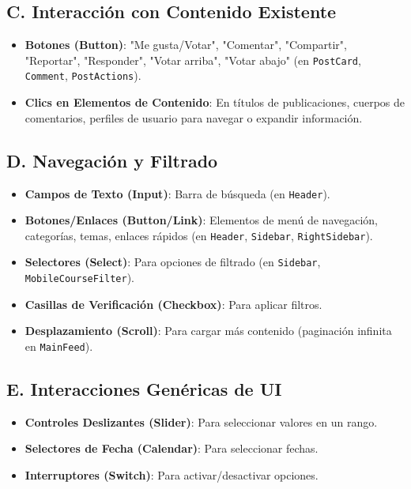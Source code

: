 \documentclass{article}
\begin{document}
\subsection*{C. Interacción con Contenido Existente}
\begin{itemize}
    \item \textbf{Botones (Button)}: "Me gusta/Votar", "Comentar", "Compartir", "Reportar", "Responder", "Votar arriba", "Votar abajo" (en \texttt{PostCard}, \texttt{Comment}, \texttt{PostActions}).
    \item \textbf{Clics en Elementos de Contenido}: En títulos de publicaciones, cuerpos de comentarios, perfiles de usuario para navegar o expandir información.
\end{itemize}

\subsection*{D. Navegación y Filtrado}
\begin{itemize}
    \item \textbf{Campos de Texto (Input)}: Barra de búsqueda (en \texttt{Header}).
    \item \textbf{Botones/Enlaces (Button/Link)}: Elementos de menú de navegación, categorías, temas, enlaces rápidos (en \texttt{Header}, \texttt{Sidebar}, \texttt{RightSidebar}).
    \item \textbf{Selectores (Select)}: Para opciones de filtrado (en \texttt{Sidebar}, \texttt{MobileCourseFilter}).
    \item \textbf{Casillas de Verificación (Checkbox)}: Para aplicar filtros.
    \item \textbf{Desplazamiento (Scroll)}: Para cargar más contenido (paginación infinita en \texttt{MainFeed}).
\end{itemize}

\subsection*{E. Interacciones Genéricas de UI}
\begin{itemize}
    \item \textbf{Controles Deslizantes (Slider)}: Para seleccionar valores en un rango.
    \item \textbf{Selectores de Fecha (Calendar)}: Para seleccionar fechas.
    \item \textbf{Interruptores (Switch)}: Para activar/desactivar opciones.
\end{itemize}
\end{document}
